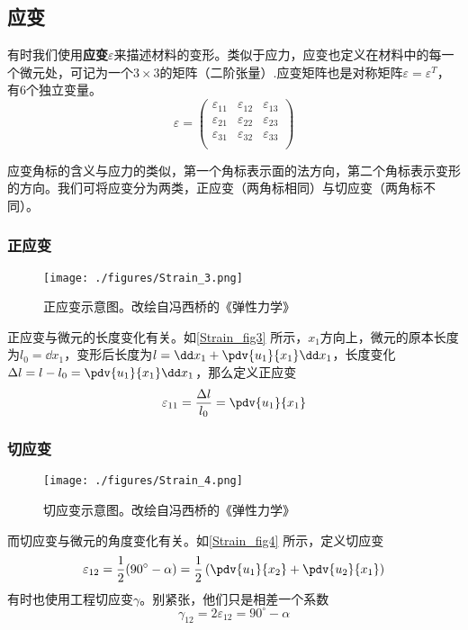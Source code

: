 \subsection{应变}
有时我们使用\textbf{应变}$\varepsilon$来描述材料的变形。类似于应力，应变也定义在材料中的每一个微元处，可记为一个$3\times3$的矩阵（二阶张量）.应变矩阵也是对称矩阵$\varepsilon=\varepsilon^T$，有$6$个独立变量。
\begin{equation}
\varepsilon = 
\begin{pmatrix}
\varepsilon_{11}&\varepsilon_{12}& \varepsilon_{13}\\
\varepsilon_{21}&\varepsilon_{22}& \varepsilon_{23}\\
\varepsilon_{31}&\varepsilon_{32}& \varepsilon_{33}\\
\end{pmatrix}
\end{equation}

应变角标的含义与应力的类似，第一个角标表示面的法方向，第二个角标表示变形的方向。我们可将应变分为两类，正应变（两角标相同）与切应变（两角标不同）。

\subsubsection{正应变}
\begin{figure}[ht]
\centering
\texttt{[image: ./figures/Strain\_3.png]}
\caption{正应变示意图。改绘自冯西桥的《弹性力学》} \label{Strain_fig3}
\end{figure}
正应变与微元的长度变化有关。如\autoref{Strain_fig3} 所示，$x_1$方向上，微元的原本长度为$l_0 = \dd x_1$，变形后长度为$ l =\dd x_1+\pdv{u_1}{x_1}\dd x_1$，长度变化$\Delta l = l-l_0 = \pdv{u_1}{x_1}\dd x_1$，那么定义正应变
\begin{equation}
\varepsilon_{11} = \frac{\Delta l}{l_0} =\pdv{u_1}{x_1}
\end{equation}

\subsubsection{切应变}
\begin{figure}[ht]
\centering
\texttt{[image: ./figures/Strain\_4.png]}
\caption{切应变示意图。改绘自冯西桥的《弹性力学》} \label{Strain_fig4}
\end{figure}
而切应变与微元的角度变化有关。如\autoref{Strain_fig4} 所示，定义切应变
\begin{equation}
\varepsilon_{12} = \frac{1}{2}(90^\circ - \alpha) = \frac{1}{2}\left(\pdv{u_1}{x_2}+\pdv{u_2}{x_1}\right)
\end{equation}
有时也使用工程切应变$\gamma$。别紧张，他们只是相差一个系数
\begin{equation}
\gamma_{12} = 2\varepsilon_{12} = 90^\circ - \alpha
\end{equation}

